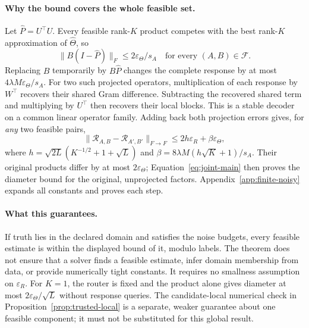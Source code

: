 \paragraph{Why the bound covers the whole feasible set.}
Let $\widehat P=U^\top U$. Every feasible rank-$K$ product competes with
the best rank-$K$ approximation of $\widehat\Theta$, so
\begin{equation}
 \|B(I-\widehat P)\|_F\le 2\varepsilon_\Theta/s_A
 \quad\text{for every }(A,B)\in\mathcal F.
 \label{eq:uniform-subspace-main}
\end{equation}
Replacing $B$ temporarily by $B\widehat P$ changes the complete response
by at most $4\lambda M\varepsilon_\Theta/s_A$. For two such projected
operators, multiplication of each response by $W^\top$ recovers their shared
Gram difference. Subtracting the recovered shared term and multiplying
by $U^\top$ then recovers their local blocks.
This is a stable decoder on a common linear operator family.
Adding back both projection errors gives, for \emph{any} two feasible pairs,
\begin{equation}
 \|\mathcal R_{A,B}-\mathcal R_{A',B'}\|_{F\to F}
 \le 2h\varepsilon_R+\beta\varepsilon_\Theta,
 \label{eq:finite-bridge-main}
\end{equation}
where $h=\sqrt{2L}(K^{-1/2}+1+\sqrt L)$ and
$\beta=8\lambda M(h\sqrt K+1)/s_A$.
Their original products differ by at most $2\varepsilon_\Theta$;
Equation~\ref{eq:joint-main} then proves the diameter bound for the original,
unprojected factors. Appendix~\ref{app:finite-noisy} expands all constants
and proves each step.

\paragraph{What this guarantees.}
If truth lies in the declared domain and satisfies the noise budgets, every
feasible estimate is within the displayed bound of it, modulo labels.
The theorem does not ensure that a solver finds a feasible estimate, infer
domain membership from data, or provide numerically tight constants.
It requires no smallness assumption on $\varepsilon_R$. For $K=1$, the
router is fixed and the product alone gives diameter at most
$2\varepsilon_\Theta/\sqrt L$ without response queries.
The candidate-local numerical check in
Proposition~\ref{prop:trusted-local} is a separate, weaker guarantee about
one feasible component; it must not be substituted for this global result.
